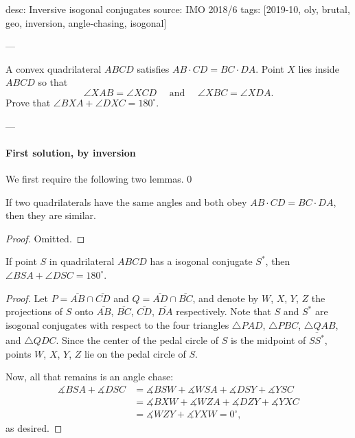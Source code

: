 desc: Inversive isogonal conjugates
source: IMO 2018/6
tags: [2019-10, oly, brutal, geo, inversion, angle-chasing, isogonal]

---

A convex quadrilateral $ABCD$ satisfies $AB\cdot CD=BC\cdot DA$. Point $X$ lies inside $ABCD$ so that \[\angle XAB=\angle{XCD}\quad\text{ and }\quad\angle XBC=\angle XDA.\]
Prove that $\angle BXA+\angle DXC=180^\circ$.

---

\paragraph{First solution, by inversion}     We first require the following two lemmas.
\setcounter{lemma}0
\begin{lemma}
    If two quadrilaterals have the same angles and both obey $AB\cdot CD=BC\cdot DA$, then they are similar.
\end{lemma}
\begin{proof}
    Omitted.
\end{proof}
\begin{lemma}
    If point $S$ in quadrilateral $ABCD$ has a isogonal conjugate $S^*$, then $\angle BSA+\angle DSC=180^\circ$.
\end{lemma}
\begin{proof}
    Let $P=\overline{AB}\cap\overline{CD}$ and $Q=\overline{AD}\cap\overline{BC}$, and denote by $W$, $X$, $Y$, $Z$ the projections of $S$ onto $\overline{AB}$, $\overline{BC}$, $\overline{CD}$, $\overline{DA}$ respectively. Note that $S$ and $S^*$ are isogonal conjugates with respect to the four triangles $\triangle PAD$, $\triangle PBC$, $\triangle QAB$, and $\triangle QDC$. Since the center of the pedal circle of $S$ is the midpoint of $\overline{SS^*}$, points $W$, $X$, $Y$, $Z$ lie on the pedal circle of $S$.

    Now, all that remains is an angle chase:
    \begin{align*}
        \measuredangle BSA+\measuredangle DSC&=\measuredangle BSW+\measuredangle WSA+\measuredangle DSY+\measuredangle YSC\\
        &=\measuredangle BXW+\measuredangle WZA+\measuredangle DZY+\measuredangle YXC\\
        &=\measuredangle WZY+\measuredangle YXW=0^\circ,
    \end{align*}
    as desired.
\end{proof}


